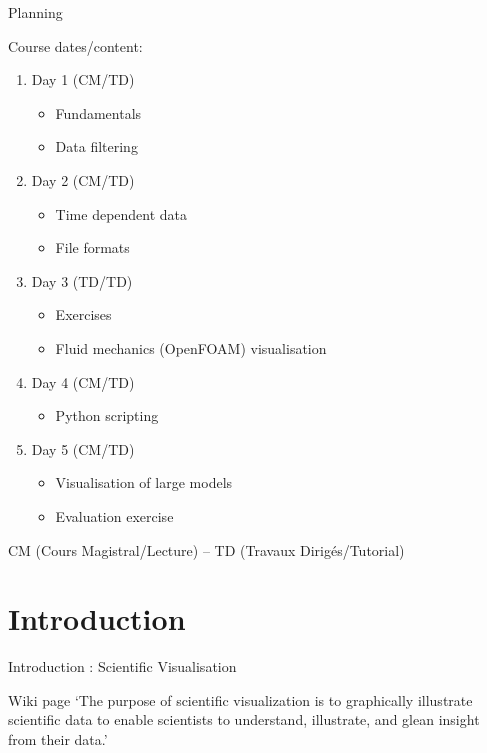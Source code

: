 \documentclass{beamer}
\begin{document}
\begin{frame}{Planning}

  Course dates/content:
  \begin{enumerate}
    \item Day 1 (CM/TD)
    \begin{itemize}
        \item Fundamentals
        \item Data filtering
    \end{itemize}{}
    \item Day 2 (CM/TD)
    \begin{itemize}
        \item Time dependent data
        \item File formats
    \end{itemize}{}
    \item Day 3 (TD/TD)
    \begin{itemize}
        \item Exercises
        \item Fluid mechanics (OpenFOAM) visualisation
    \end{itemize}{}
    \item Day 4 (CM/TD)
    \begin{itemize}
        \item Python scripting
    \end{itemize}{}
    \item Day 5 (CM/TD)
    \begin{itemize}
        \item Visualisation of large models
        \item Evaluation exercise
    \end{itemize}{}
  \end{enumerate}{}
  
  \vskip 12pt
  {\tiny CM (Cours Magistral/Lecture) -- TD (Travaux Dirigés/Tutorial)}
    
    
\end{frame}{}



\section{Introduction}

\begin{frame}{Introduction : Scientific Visualisation}

Wiki page `The purpose of scientific visualization is to graphically illustrate scientific data to enable scientists to understand, illustrate, and glean insight from their data.'

\end{frame}
\end{document}
